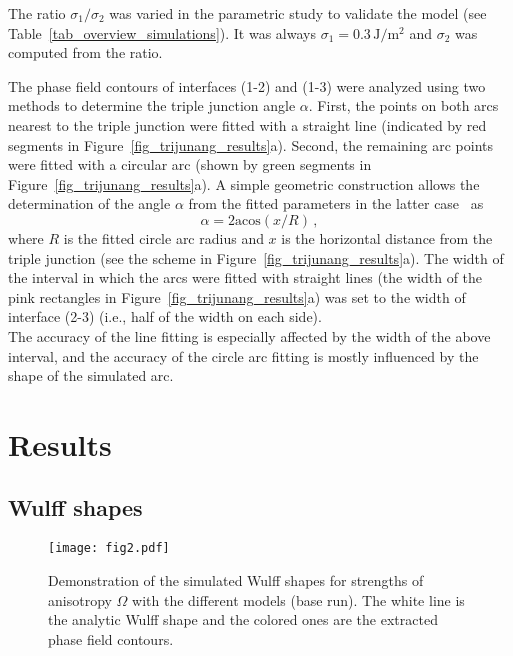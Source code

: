 The ratio $\sigma_1/\sigma_2$ was varied in the parametric study to validate the model (see Table~\ref{tab_overview_simulations}). It was always $\sigma_1=0.3\,\mathrm{J/m^2}$ and $\sigma_2$ was computed from the ratio.

The phase field contours of interfaces (1-2) and (1-3) were analyzed using two methods to determine the triple junction angle $\alpha$. First, the points on both arcs nearest to the triple junction were fitted with a straight line (indicated by red segments in Figure~\ref{fig_trijunang_results}a). Second, the remaining arc points were fitted with a circular arc (shown by green segments in Figure~\ref{fig_trijunang_results}a). A simple geometric construction allows the determination of the angle $\alpha$ from the fitted parameters in the latter case~\cite{Moelans2009} as
\begin{equation}
	\alpha = 2\mathrm{acos}(x/R)\,,
\end{equation}
where $R$ is the fitted circle arc radius and $x$ is the horizontal distance from the triple junction (see the scheme in Figure~\ref{fig_trijunang_results}a). The width of the interval in which the arcs were fitted with straight lines (the width of the pink rectangles in Figure~\ref{fig_trijunang_results}a) was set to the width of interface (2-3) (i.e., half of the width on each side).\\
The accuracy of the line fitting is especially affected by the width of the above interval, and the accuracy of the circle arc fitting is mostly influenced by the shape of the simulated arc.


\section{Results}
\label{sec_Results}

\subsection{Wulff shapes}
\begin{figure}
	\centering
	\texttt{[image: fig2.pdf]}
	\caption[Demonstration of the simulated Wulff shapes]{Demonstration of the simulated Wulff shapes for strengths of anisotropy $\Omega$ with the different models (base run). The white line is the analytic Wulff shape and the colored ones are the extracted phase field contours.}
	\label{fig_wulff_demo_shapes}
\end{figure}

